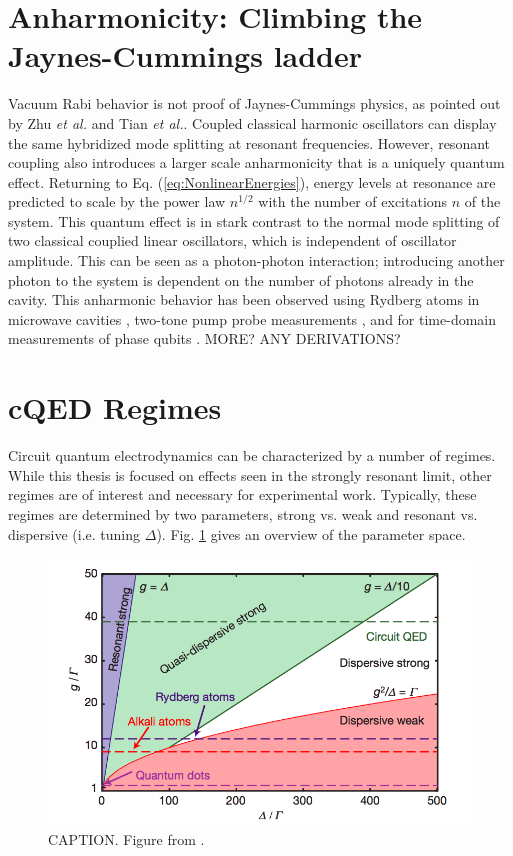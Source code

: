 \documentclass[12 pt]{book}
\begin{document}
\section{Anharmonicity: Climbing the Jaynes-Cummings ladder}\label{sec:Anharmonicity}
Vacuum Rabi behavior is not proof of Jaynes-Cummings physics, as pointed out by Zhu \emph{et al.}\cite{Zhu} and Tian \emph{et al.}\cite{Tian}. Coupled classical harmonic oscillators can display the same hybridized mode splitting at resonant frequencies. However, resonant coupling also introduces a larger scale anharmonicity that is a uniquely quantum effect. Returning to  Eq. (\ref{eq:NonlinearEnergies}), energy levels at resonance are predicted to scale by the power law $n^{1/2}$ with the number of excitations $n$ of the system. This quantum effect is in stark contrast to the normal mode splitting of two classical couplied linear oscillators, which is independent of oscillator amplitude\cite{Fink}. This can be seen as a photon-photon interaction; introducing another photon to the system is dependent on the number of photons already in the cavity. This anharmonic behavior has been observed using Rydberg atoms in microwave cavities \cite{}, two-tone pump probe measurements \cite{Fink}, and for time-domain measurements of phase qubits \cite{Hofheinz, Wang}.
MORE? ANY DERIVATIONS?

\section{cQED Regimes} %
Circuit quantum electrodynamics can be characterized by a number of regimes. While this thesis is focused on effects seen in the strongly resonant limit, other regimes are of interest and necessary for experimental work. Typically, these regimes are determined by two parameters, strong vs. weak and resonant vs. dispersive (i.e. tuning $\Delta$). Fig. \ref{fig:Regimes} gives an overview of the parameter space. 

\begin{figure}[h] 
   \centering
   \includegraphics[width=5in]{HouckParameterSpace.png} 
   \caption{CAPTION. Figure from \cite{SchusterResolving}.}
   \label{fig:Regimes}
\end{figure}
\end{document}

